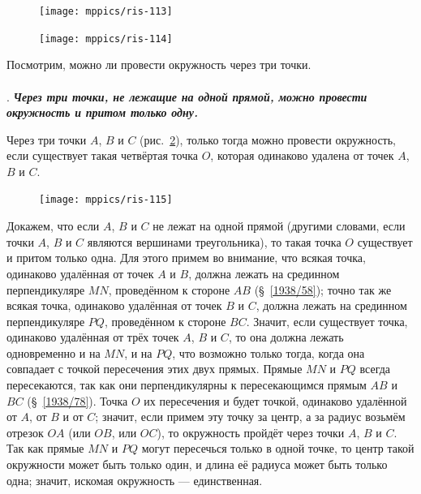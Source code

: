 \documentclass[twoside]{book}
\begin{document}
\begin{figure}[h!]
\begin{minipage}{.48\textwidth}
\centering
\texttt{[image: mppics/ris-113]}
\end{minipage}
\hfill
\begin{minipage}{.48\textwidth}
\centering
\texttt{[image: mppics/ris-114]}
\end{minipage}

\medskip

\begin{minipage}{.48\textwidth}
\centering
\caption{}\label{1938/ris-113}
\end{minipage}
\hfill
\begin{minipage}{.48\textwidth}
\centering
\caption{}\label{1938/ris-114}
\end{minipage}
\vskip-4mm
\end{figure}

Посмотрим, можно ли провести окружность через три точки.

\paragraph{}\label{1938/104}
.
\textbf{\emph{Через три точки, не лежащие на одной прямой, можно провести окружность и притом только одну.}}

Через три точки $A$, $B$ и $C$ (рис.~\ref{1938/ris-115}), только тогда можно провести окружность, если существует такая четвёртая точка $O$, которая одинаково удалена от точек $A$, $B$ и $C$.

\begin{figure}
\centering
\texttt{[image: mppics/ris-115]}
\caption{}\label{1938/ris-115}
\end{figure}

Докажем, что если $A$, $B$ и $C$ не лежат на одной прямой 
(другими словами, если точки $A$, $B$ и $C$ являются вершинами треугольника),
то такая точка $O$ существует и притом только одна.
Для этого примем во внимание, что всякая точка, одинаково удалённая от точек $A$ и $B$, должна лежать на срединном перпендикуляре $MN$, проведённом к стороне $AB$ (§~\ref{1938/58}); 
точно так же всякая точка, одинаково удалённая от точек $B$ и $C$, должна лежать на срединном перпендикуляре $PQ$, проведённом к стороне $BC$.
Значит, если существует точка, одинаково удалённая от трёх точек $A$, $B$ и $C$, то она должна лежать одновременно и на $MN$, и на $PQ$, что возможно только тогда, когда она совпадает с точкой пересечения этих двух прямых.
Прямые $MN$ и $PQ$ всегда пересекаются, так как они перпендикулярны к пересекающимся прямым $AB$ и $BC$ (§~\ref{1938/78}).
Точка $O$ их пересечения и будет точкой, одинаково удалённой от $A$, от $B$ и от $C$;
значит, если примем эту точку за центр, а за радиус возьмём отрезок $OA$ (или $OB$, или $OC$), то окружность пройдёт через точки $A$, $B$ и $C$.
Так как прямые $MN$ и $PQ$ могут пересечься только в одной точке, то центр такой окружности может быть только один, и длина её радиуса может быть только одна;
значит, искомая окружность — единственная.
\end{document}
